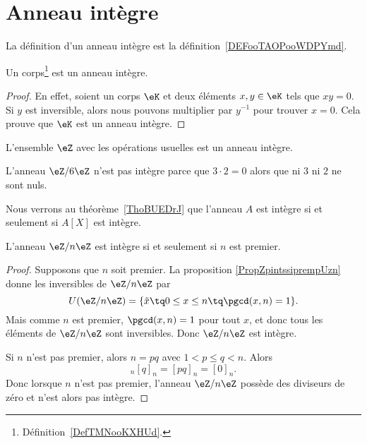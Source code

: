 \section{Anneau intègre}
\label{SECAnneauxIntegres}

La définition d'un anneau intègre est la définition~\ref{DEFooTAOPooWDPYmd}.

\begin{lemma}     \label{LEMooZSMEooUmSXWZ}
    Un corps\footnote{Définition~\ref{DefTMNooKXHUd}.} est un anneau intègre.
\end{lemma}

\begin{proof}
    En effet, soient un corps \( \eK\) et deux éléments \( x,y\in \eK\) tels que \( xy=0\). Si \( y\) est inversible, alors nous pouvons multiplier par \( y^{-1}\) pour trouver \( x=0\). Cela prouve que \( \eK\) est un anneau intègre.
\end{proof}

\begin{example}     \label{EXooLDXRooSxUAXs}
    L'ensemble \( \eZ\) avec les opérations usuelles est un anneau intègre.
\end{example}

\begin{example}
    L'anneau \( \eZ/6\eZ\) n'est pas intègre parce que \( 3\cdot 2=0\) alors que ni \( 3\) ni \( 2\) ne sont nuls.
\end{example}

Nous verrons au théorème~\ref{ThoBUEDrJ} que l'anneau \( A\) est intègre si et seulement si \( A[X]\) est intègre.

\begin{corollary}   \label{CorZnInternprem}
    L'anneau \( \eZ/n\eZ\) est intègre si et seulement si \( n\) est premier.
\end{corollary}

\begin{proof}
    Supposons que \( n\) soit premier. La proposition \ref{PropZpintssiprempUzn} donne les inversibles de \( \eZ/n\eZ\) par
    \begin{equation}
        U(\eZ/n\eZ)=\{ \tilde x\tq 0\leq x\leq n\tq\pgcd(x,n)=1 \}.
    \end{equation}
    Mais comme \( n\) est premier, \( \pgcd(x,n)=1\) pour tout \( x\), et donc tous les éléments de \( \eZ/n\eZ\) sont inversibles. Donc \( \eZ/n\eZ\) est intègre.

    Si \( n\) n'est pas premier, alors \( n=pq\) avec \( 1<p\leq q<n\). Alors
    \begin{equation}
        [p]_n[q]_n=[pq]_n=[0]_n.
    \end{equation}
    Donc lorsque \( n\) n'est pas premier,  l'anneau \( \eZ/n\eZ\) possède des diviseurs de zéro et n'est alors pas intègre.
\end{proof}

